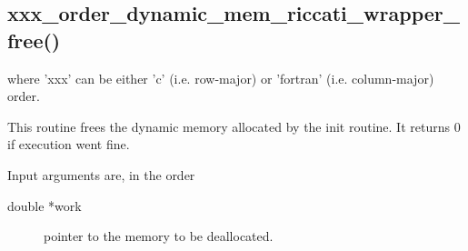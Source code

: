 \documentclass[a4paper]{report}
\begin{document}
\subsection{xxx\_order\_dynamic\_mem\_riccati\_wrapper\_free() } 
where 'xxx' can be either 'c' (i.e. row-major) or 'fortran' (i.e. column-major) order.

This routine frees the dynamic memory allocated by the init routine.
It returns 0 if execution went fine.

Input arguments are, in the order
\begin{description}
\item[double *work] pointer to the memory to be deallocated.
\end{description}
\end{document}
